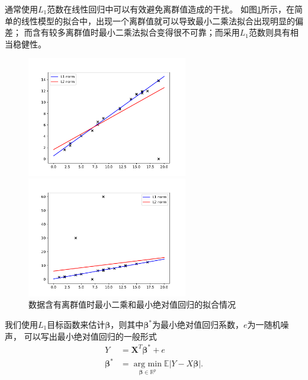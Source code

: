 通常使用$L_1$范数在线性回归中可以有效避免离群值造成的干扰。
如图\ref{fig2.1}所示，在简单的线性模型的拟合中，出现一个离群值就可以导致最小二乘法拟合出现明显的偏差；
    而含有较多离群值时最小二乘法拟合变得很不可靠；而采用$L_1$范数则具有相当稳健性。
\begin{figure}[H]
    \centering
    \begin{minipage}[t]{0.48\textwidth}
    \includegraphics[width=7cm]{pics/chapter2/l1-l2-diff2.pdf}
    \end{minipage}
    \begin{minipage}[t]{0.48\textwidth}
    \includegraphics[width=7cm]{pics/chapter2/l1-l2-diff.pdf}
    \end{minipage}
    \caption{\small 数据含有离群值时最小二乘和最小绝对值回归的拟合情况}
    \label{fig2.1}

\end{figure}

我们使用$L_1$目标函数来估计$\bm{\beta}$，则其中$\bm{\beta}^*$为最小绝对值回归系数，$e$为一随机噪声，
可以写出最小绝对值回归的一般形式
\begin{equation} \label{l1losstotal}
    \begin{split}
    Y &= \bm{X}^T\bm{\beta}^* + e\\
    \bm{\beta}^* &= \underset{\bm{\beta}\in \mathbb{R}^{p}}{\operatorname {arg\ min}}
    \mathbb{E}|Y - X\bm{\beta}|.
    \end{split}
\end{equation}


